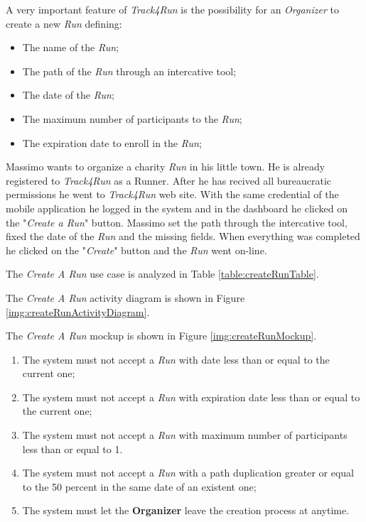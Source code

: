 A very important feature of \textit{Track4Run} is the possibility for an \textit{Organizer} to create a new \textit{Run} defining:
\begin{itemize}
  \item The name of the \textit{Run};
  \item The path of the \textit{Run} through an intercative tool;
  \item The date of the \textit{Run};
  \item The maximum number of participants to the \textit{Run};
  \item The expiration date to enroll in the \textit{Run};
\end{itemize}

Massimo wants to organize a charity \textit{Run} in his little town. He is already registered to \textit{Track4Run} as a Runner. After he has recived all bureaucratic permissions he went to \textit{Track4Run} web site.
With the same credential of the mobile application he logged in the system and in the dashboard he clicked on the "\textit{Create a Run}" button. Massimo set the path through the intercative tool, fixed the date of the \textit{Run} and the missing fields. When everything was completed he clicked on the "\textit{Create}" button and the \textit{Run} went on-line.

The \textit{Create A Run} use case is analyzed in Table \ref{table:createRunTable}.

The \textit{Create A Run} activity diagram is shown in Figure \ref{img:createRunActivityDiagram}.

The \textit{Create A Run} mockup is shown in Figure \ref{img:createRunMockup}.

\begin{enumerate}
  \item The system must not accept a \textit{Run} with date less than or equal to the current one;
  \item The system must not accept a \textit{Run} with expiration date less than or equal to the current one;
  \item The system must not accept a \textit{Run} with maximum number of participants less than or equal to 1.
  \item The system must not accept a \textit{Run} with a path duplication greater or equal to the 50 percent in the same date of an existent one;
  \item The system must let the \textbf{Organizer} leave the creation process at anytime.
\end{enumerate}

